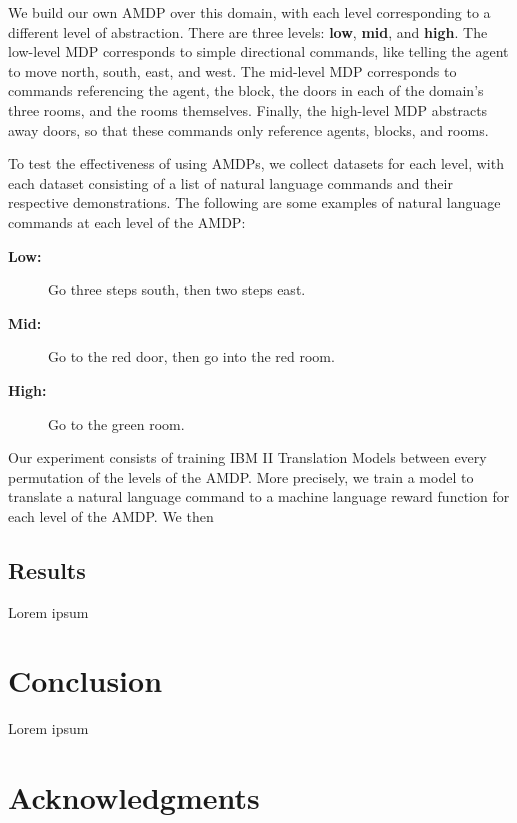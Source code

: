 \documentclass[conference]{IEEEtran}
\begin{document}
We build our own AMDP over this domain, with each level corresponding to a different level of abstraction. There are three levels: \textbf{low}, \textbf{mid}, and \textbf{high}. The low-level MDP corresponds to simple directional commands, like telling the agent to move north, south, east, and west. The mid-level MDP corresponds to commands referencing the agent, the block, the doors in each of the domain's three rooms, and the rooms themselves. Finally, the high-level MDP abstracts away doors, so that these commands only reference agents, blocks, and rooms.

To test the effectiveness of using AMDPs, we collect datasets for each level, with each dataset consisting of a list of natural language commands and their respective demonstrations. The following are some examples of natural language commands at each level of the AMDP:

\begin{description}
\item[\textbf{Low:}] Go three steps south, then two steps east.
\item[\textbf{Mid:}] Go to the red door, then go into the red room.
\item[\textbf{High:}] Go to the green room.
\end{description}

Our experiment consists of training IBM II Translation Models between every permutation of the levels of the AMDP. More precisely, we train a model to translate a natural language command to a machine language reward function for each level of the AMDP. We then
\subsection{Results}

Lorem ipsum

\section{Conclusion}
\label{sec:conclusion}

Lorem ipsum

\section*{Acknowledgments}




\end{document}
